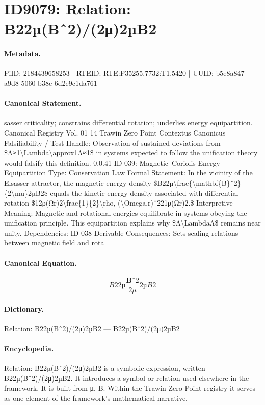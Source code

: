 \section*{ID9079: Relation: B22µ(Bˆ2)/(2μ)2µB2}
\paragraph{Metadata.}
PiID: 2184439658253 | RTEID: RTE:P35255.7732:T1.5420 | UUID: b5e8a847-a9d8-5060-b38c-6d2e9c1da761

\paragraph{Canonical Statement.}
sasser criticality; constrains differential rotation; underlies energy equipartition. Canonical Registry Vol. 01 14 Trawin Zero Point Contextus Canonicus Falsifiability / Test Handle: Observation of sustained deviations from \$Λ≈1\textbackslash{}Lambda\textbackslash{}approx1Λ≈1\$ in systems expected to follow the unification theory would falsify this definition. 0.0.41 ID 039: Magnetic–Coriolis Energy Equipartition Type: Conservation Law Formal Statement: In the vicinity of the Elsasser attractor, the magnetic energy density \$B22µ\textbackslash{}frac\{\textbackslash{}mathbf\{B\}ˆ2\}\{2\textbackslash{}mu\}2µB2\$ equals the kinetic energy density associated with differential rotation \$12ρ(Ωr)2\textbackslash{}frac\{1\}\{2\}\textbackslash{}rho, (\textbackslash{}Omega,r)ˆ221ρ(Ωr)2.\$ Interpretive Meaning: Magnetic and rotational energies equilibrate in systems obeying the unification principle. This equipartition explains why \$Λ\textbackslash{}LambdaΛ\$ remains near unity. Dependencies: ID 038 Derivable Consequences: Sets scaling relations between magnetic field and rota

\paragraph{Canonical Equation.}
\[
B22µ\frac{\mathbf{B}ˆ2}{2\mu}2µB2
\]

\paragraph{Dictionary.}
Relation: B22µ(Bˆ2)/(2μ)2µB2 — B22µ(Bˆ2)/(2μ)2µB2

\paragraph{Encyclopedia.}
Relation: B22µ(Bˆ2)/(2μ)2µB2 is a symbolic expression, written B22µ(Bˆ2)/(2μ)2µB2. It introduces a symbol or relation used elsewhere in the framework. It is built from μ, B. Within the Trawin Zero Point registry it serves as one element of the framework's mathematical narrative.
